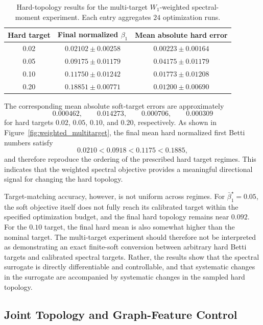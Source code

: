 \documentclass[pdflatex,sn-mathphys-num]{sn-jnl}%
\theoremstyle{thmstyleone}%
\theoremstyle{thmstyletwo}%
\theoremstyle{thmstylethree}%
\begin{document}
\begin{table}[t]
    \centering
    \caption{
    Hard-topology results for the multi-target \(W_1\)-weighted spectral-moment experiment.
    Each entry aggregates \(24\) optimization runs.
    }
    \label{tab:weighted_topology_control}
    \begin{tabular}{c|c|c}
        \hline
        Hard target
        & Final normalized \(\beta_1\)
        & Mean absolute hard error \\
        \hline
        0.02 & \(0.02102\pm0.00258\) & \(0.00223\pm0.00164\) \\
        0.05 & \(0.09175\pm0.01179\) & \(0.04175\pm0.01179\) \\
        0.10 & \(0.11750\pm0.01242\) & \(0.01773\pm0.01208\) \\
        0.20 & \(0.18851\pm0.00771\) & \(0.01200\pm0.00690\) \\
        \hline
    \end{tabular}
\end{table}

The corresponding mean absolute soft-target errors are approximately
\[
0.000462,\qquad
0.014273,\qquad
0.000706,\qquad
0.000309
\]
for hard targets \(0.02\), \(0.05\), \(0.10\), and \(0.20\), respectively.
As shown in Figure~\ref{fig:weighted_multitarget}, the final mean hard normalized first Betti numbers satisfy
\[
0.0210
<
0.0918
<
0.1175
<
0.1885,
\]
and therefore reproduce the ordering of the prescribed hard target regimes.
This indicates that the weighted spectral objective provides a meaningful directional signal for changing the hard topology.

Target-matching accuracy, however, is not uniform across regimes.
For \(\bar{\beta}_1^\star=0.05\), the soft objective itself does not fully reach its calibrated target within the specified optimization budget, and the final hard topology remains near \(0.092\).
For the \(0.10\) target, the final hard mean is also somewhat higher than the nominal target.
The multi-target experiment should therefore not be interpreted as demonstrating an exact finite-soft conversion between arbitrary hard Betti targets and calibrated spectral targets.
Rather, the results show that the spectral surrogate is directly differentiable and controllable, and that systematic changes in the surrogate are accompanied by systematic changes in the sampled hard topology.


\subsection{Joint Topology and Graph-Feature Control}
\end{document}
